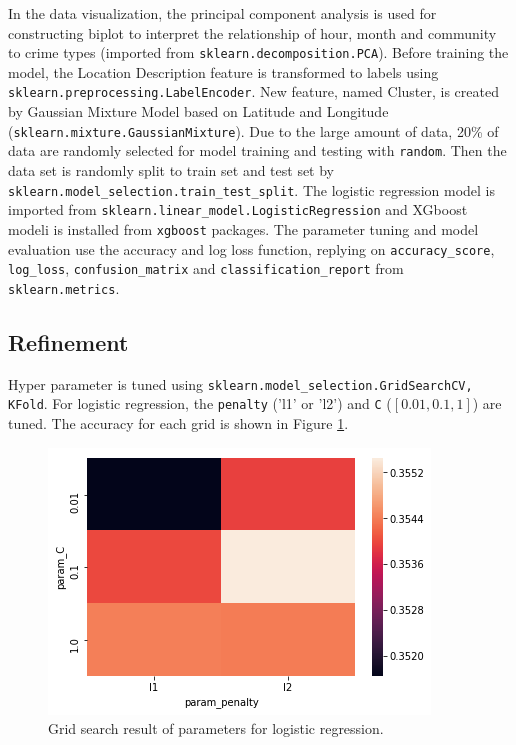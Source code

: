 \documentclass[12pt]{article}
\begin{document}
In the data visualization, the principal component analysis is used for constructing biplot to interpret the relationship of hour, month and community to crime types (imported from \verb|sklearn.decomposition.PCA|). Before training the model, the Location Description feature is transformed to labels using \verb|sklearn.preprocessing.LabelEncoder|. New feature, named Cluster, is created by Gaussian Mixture Model based on Latitude and Longitude (\verb|sklearn.mixture.GaussianMixture|). Due to the large amount of data, 20\% of data are randomly selected for model training and testing with \verb|random|. Then the data set is randomly split to train set and test set by \verb|sklearn.model_selection.train_test_split|. The logistic regression model is imported from \verb|sklearn.linear_model.LogisticRegression| and XGboost modeli is installed from \verb|xgboost| packages. The parameter tuning and model evaluation use the accuracy and log loss function, replying on \verb|accuracy_score|, \verb|log_loss|, \verb|confusion_matrix| and \verb|classification_report| from \verb|sklearn.metrics|.



\subsection{Refinement}
Hyper parameter is tuned using \verb|sklearn.model_selection.GridSearchCV, KFold|.
For logistic regression, the \verb|penalty| ('l1' or 'l2') and \verb|C| ($[0.01, 0.1, 1]$) are tuned. The accuracy for each grid is shown in Figure \ref{fig:logit}.

\begin{figure}[ht]
\includegraphics[scale=0.6]{figure/logit_parameter.png}
\centering
\caption{Grid search result of parameters for logistic regression.}
\label{fig:logit}
\end{figure}
\end{document}
